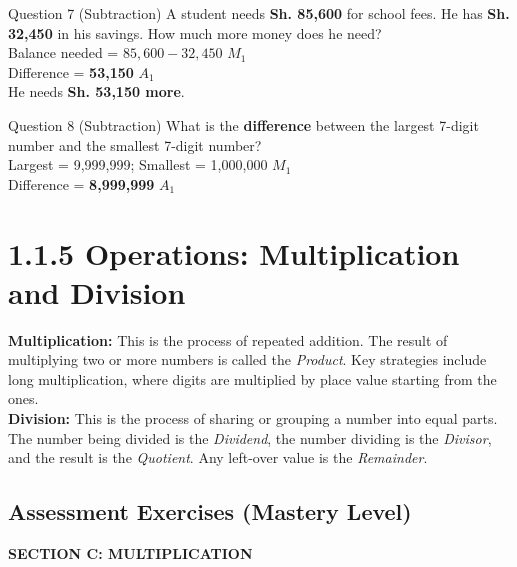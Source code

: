 \documentclass[12pt, a4paper, oneside]{article}
\begin{document}
\begin{solvingbox}{Question 7 (Subtraction)}
A student needs \textbf{Sh. 85,600} for school fees. He has \textbf{Sh. 32,450} in his savings. How much more money does he need? \\
Balance needed = $85,600 - 32,450$ \hfill $M_1$ \\
Difference = \textbf{53,150} \hfill $A_1$ \\
He needs \textbf{Sh. 53,150 more}.
\end{solvingbox}

\begin{solvingbox}{Question 8 (Subtraction)}
What is the \textbf{difference} between the largest 7-digit number and the smallest 7-digit number? \\
Largest = 9,999,999; Smallest = 1,000,000 \hfill $M_1$ \\
Difference = \textbf{8,999,999} \hfill $A_1$
\end{solvingbox}

\section*{1.1.5 Operations: Multiplication and Division}

\begin{tcolorbox}[colback=lightgrey, colframe=primaryblue, title=\textbf{Concept Summary}, arc=5pt]
    \textbf{Multiplication:} This is the process of repeated addition. The result of multiplying two or more numbers is called the \textit{Product}. Key strategies include long multiplication, where digits are multiplied by place value starting from the ones. \\
    
    \textbf{Division:} This is the process of sharing or grouping a number into equal parts. The number being divided is the \textit{Dividend}, the number dividing is the \textit{Divisor}, and the result is the \textit{Quotient}. Any left-over value is the \textit{Remainder}.
\end{tcolorbox}

\subsection*{Assessment Exercises (Mastery Level)}

\begin{center}
    \textbf{\color{strandcolor} SECTION C: MULTIPLICATION}
\end{center}
\end{document}
